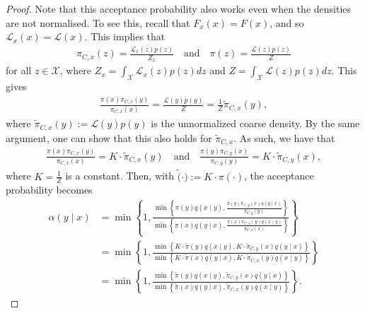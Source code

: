 \documentclass[12pt]{article}
\theoremstyle{definition}
\theoremstyle{remark}
\theoremstyle{plain}
\begin{document}
\begin{proof}
Note that this acceptance probability also works even when the densities are not normalised. 
To see this, recall that $F_x(x) = F(x)$, and so $\mathcal L_x(x) = \mathcal L(x)$. 
This implies that
\begin{align*}
  \pi_{C,x}(z) = \frac{\mathcal L_x(z)p(z)}{Z_x} \quad \text{and} \quad \pi(z) = \frac{\mathcal L(z)p(z)}{Z}
\end{align*}
for all $z \in \mathcal X$, where $Z_x = \int_\mathcal X \mathcal L_x(z)p(z) dz$ and $Z = \int_\mathcal X \mathcal L(z)p(z) dz$.
This gives
\begin{align*}
  \frac{\pi(x)\pi_{C,x}(y)}{\pi_{C,x}(x)} = \frac{\mathcal L(y)p(y)}{Z} = \frac{1}{Z} \tilde{\pi}_{C,x}(y),
\end{align*}
where $\tilde{\pi}_{C,x}(y) := \mathcal L(y)p(y)$ is the unnormalized coarse density. 
By the same argument, one can show that this also holds for $\tilde{\pi}_{C,x}$.
As such, we have that 
\begin{align*}
  \frac{\pi(x)\pi_{C,x}(y)}{\pi_{C,x}(x)} = K\cdot \tilde{\pi}_{C,x}(y) 
  \quad \text{and} \quad
  \frac{\pi(y)\pi_{C,y}(x)}{\pi_{C,y}(y)} = K\cdot \tilde{\pi}_{C,y}(x),
\end{align*}
where $K = \frac{1}{Z}$ is a constant. Then, with $\tilde(\cdot) := K \cdot \pi(\cdot)$, 
the acceptance probability becomes
\begin{align*}
  \alpha(y\mid x) 
  &= \min\left\{1, \frac{\min\left\{\pi(y)q(x\mid y), \frac{\pi(y)\pi_{C,y}(x)q(y\mid x)}{\pi_{C,y}(y)}\right\}}{\min\left\{\pi(x)q(y\mid x), \frac{\pi(x)\pi_{C,x}(y)q(x\mid y)}{\pi_{C,x}(x)}\right\}}\right\}\\
  &= \min\left\{1, \frac{\min\left\{K \cdot \tilde{\pi}(y)q(x\mid y), K \cdot \tilde{\pi}_{C,y}(x)q(y\mid x)\right\}}{\min\left\{K \cdot \tilde{\pi}(x)q(y\mid x), K \cdot \tilde{\pi}_{C,x}(y)q(x\mid y)\right\}}\right\}\\
  &= \min\left\{1, \frac{\min\left\{\tilde{\pi}(y)q(x\mid y), \tilde{\pi}_{C,y}(x)q(y\mid x)\right\}}{\min\left\{\tilde{\pi}(x)q(y\mid x), \tilde{\pi}_{C,x}(y)q(x\mid y)\right\}}\right\}.
\end{align*}
\end{proof}
\end{document}
